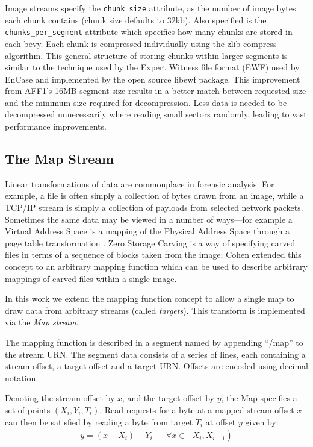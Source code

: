 \documentclass[10pt, conference]{IEEEtran}
\begin{document}
Image streams specify the \texttt{chunk\_size} attribute, as the
number of image bytes each chunk contains (chunk size defaults to
32kb). Also specified is the \texttt{chunks\_per\_segment} attribute
which specifies how many chunks are stored in each bevy. Each chunk is
compressed individually using the zlib compress algorithm. This
general structure of storing chunks within larger segments is similar
to the technique used by the Expert Witness file format (EWF) used by
EnCase\cite{encase-3.0} and implemented by the open source
libewf\cite{libewf} package. This improvement from AFF1's 16MB segment
size results in a better match between requested size and the minimum
size required for decompression. Less data is needed to be
decompressed unnecessarily where reading small sectors randomly,
leading to vast performance improvements.

\subsection{The Map Stream}
\label{map_stream}
Linear transformations of data are commonplace in forensic
analysis. For example, a file is often simply a collection of bytes
drawn from an image, while a TCP/IP stream is simply a collection of
payloads from selected network packets. Sometimes the same data may be
viewed in a number of ways---for example a Virtual Address Space is a
mapping of the Physical Address Space through a page table
transformation \cite{Tanenbaum2008}.  Zero Storage
Carving\cite{Meijer2006} is a way of specifying carved files in terms
of a sequence of blocks taken from the image; Cohen extended this
concept to an arbitrary mapping function\cite{1363239,Cohen2007} which
can be used to describe arbitrary mappings of carved files within a
single image.

In this work we extend the mapping function concept to allow a single
map to draw data from arbitrary streams (called {\em targets}). This
transform is implemented via the {\em Map stream}.

The mapping function is described in a segment named by appending
``/map'' to the stream URN. The segment data consists of a series of
lines, each containing a stream offset, a target offset and a target
URN. Offsets are encoded using decimal notation.

Denoting the stream offset by $x$, and the target offset by $y$, the
Map specifies a set of points $(X_i,Y_i,T_i)$. Read requests for a
byte at a mapped stream offset $x$ can then be satisfied by reading a
byte from target $T_i$ at offset $y$ given by:
\begin{eqnarray}
y = (x - X_i) + Y_i & &
\forall x \in \left [X_i, X_{i+1} \right )
\end{eqnarray}
\end{document}
